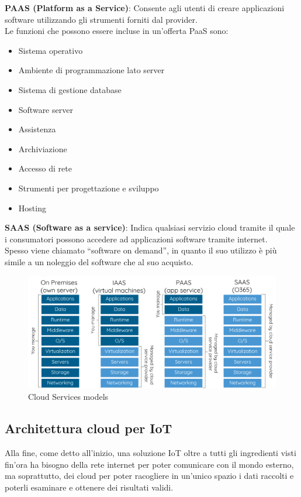 \documentclass[10pt,a4paper,oneside]{scrbook}
\begin{document}
\textbf{PAAS (Platform as a Service)}: Consente agli utenti di creare applicazioni software utilizzando gli strumenti forniti dal provider.\\
Le funzioni che possono essere incluse in un'offerta PaaS sono:
\begin{itemize}
    \item Sistema operativo
    \item Ambiente di programmazione lato server
    \item Sistema di gestione database
    \item Software server
    \item Assistenza
    \item Archiviazione
    \item Accesso di rete
    \item Strumenti per progettazione e sviluppo 
    \item Hosting
\end{itemize}
\textbf{SAAS (Software as a service)}: Indica qualsiasi servizio cloud tramite il quale i consumatori possono accedere ad applicazioni software tramite internet.\\
Spesso viene chiamato ``software on demand'', in quanto il suo utilizzo è più simile a un noleggio del software che al suo acquisto.
\begin{figure}[h]
    \centering
    \includegraphics[width=1\linewidth]{img/Cloud-service.png}
    \caption{Cloud Services models}
    \label{fig:Cloud Services models}
\end{figure}
\subsection{Architettura cloud per IoT}
Alla fine, come detto all'inizio, una soluzione IoT oltre a tutti gli ingredienti visti fin'ora ha bisogno della rete internet per poter comunicare con il mondo esterno, ma soprattutto, dei cloud per poter racogliere in un'unico spazio i dati raccolti e poterli esaminare e ottenere dei risultati validi.
\end{document}
